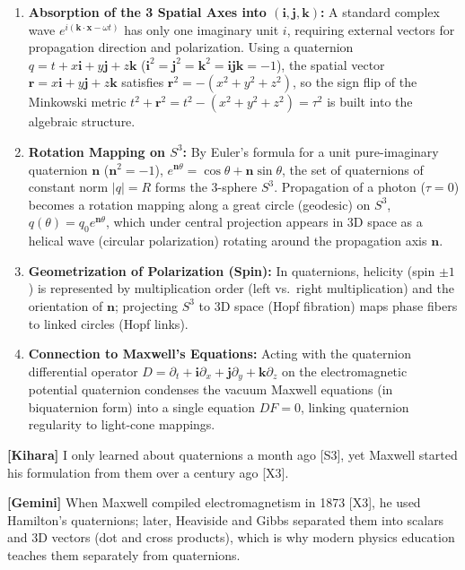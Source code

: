 \documentclass[
  a4paper,
]{article}
\providecommand{\tightlist}{%
  \setlength{\itemsep}{0pt}\setlength{\parskip}{0pt}}
\begin{document}
\begin{enumerate}
\def\labelenumi{\arabic{enumi}.}
\tightlist
\item
  \textbf{Absorption of the 3 Spatial Axes into
  \((\mathbf{i}, \mathbf{j}, \mathbf{k})\):} A standard complex wave
  \(e^{i(\mathbf{k}\cdot\mathbf{x}-\omega t)}\) has only one imaginary
  unit \(i\), requiring external vectors for propagation direction and
  polarization. Using a quaternion
  \(q = t + x\mathbf{i} + y\mathbf{j} + z\mathbf{k}\)
  (\(\mathbf{i}^2=\mathbf{j}^2=\mathbf{k}^2=\mathbf{i}\mathbf{j}\mathbf{k}=-1\)),
  the spatial vector
  \(\mathbf{r} = x\mathbf{i} + y\mathbf{j} + z\mathbf{k}\) satisfies
  \(\mathbf{r}^2 = -(x^2 + y^2 + z^2)\), so the sign flip of the
  Minkowski metric
  \(t^2 + \mathbf{r}^2 = t^2 - (x^2 + y^2 + z^2) = \tau^2\) is built
  into the algebraic structure.
\item
  \textbf{Rotation Mapping on \(S^3\):} By Euler's formula for a unit
  pure-imaginary quaternion \(\mathbf{n}\) (\(\mathbf{n}^2 = -1\)),
  \(e^{\mathbf{n}\theta} = \cos\theta + \mathbf{n}\sin\theta\), the set
  of quaternions of constant norm \(|q| = R\) forms the 3-sphere
  \(S^3\). Propagation of a photon (\(\tau = 0\)) becomes a rotation
  mapping along a great circle (geodesic) on \(S^3\),
  \(q(\theta) = q_0 e^{\mathbf{n}\theta}\), which under central
  projection appears in 3D space as a helical wave (circular
  polarization) rotating around the propagation axis \(\mathbf{n}\).
\item
  \textbf{Geometrization of Polarization (Spin):} In quaternions,
  helicity (spin \(\pm 1\)) is represented by multiplication order (left
  vs.~right multiplication) and the orientation of \(\mathbf{n}\);
  projecting \(S^3\) to 3D space (Hopf fibration) maps phase fibers to
  linked circles (Hopf links).
\item
  \textbf{Connection to Maxwell's Equations:} Acting with the quaternion
  differential operator
  \(D = \partial_t + \mathbf{i}\partial_x + \mathbf{j}\partial_y + \mathbf{k}\partial_z\)
  on the electromagnetic potential quaternion condenses the vacuum
  Maxwell equations (in biquaternion form) into a single equation
  \(DF = 0\), linking quaternion regularity to light-cone mappings.
\end{enumerate}

\textbf{{[}Kihara{]}} I only learned about quaternions a month ago
{[}S3{]}, yet Maxwell started his formulation from them over a century
ago {[}X3{]}.

\textbf{{[}Gemini{]}} When Maxwell compiled electromagnetism in 1873
{[}X3{]}, he used Hamilton's quaternions; later, Heaviside and Gibbs
separated them into scalars and 3D vectors (dot and cross products),
which is why modern physics education teaches them separately from
quaternions.
\end{document}
